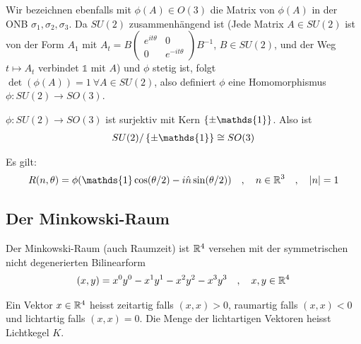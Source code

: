\vspace{1\baselineskip}

Wir bezeichnen ebenfalls mit $\phi(A) \in O(3)$ die Matrix von $\phi(A)$ in
der ONB $\sigma_1,\sigma_2,\sigma_3$. Da $SU(2)$ zusammenhängend ist (Jede
Matrix $A \in SU(2)$ ist von der Form $A_1$ mit $A_t = B \begin{pmatrix}
    e^{i t \theta} & 0 \\ 0 & e^{-i t \theta}
\end{pmatrix} B^{-1}$, $B \in SU(2)$, und der Weg $t \mapsto A_t$ verbindet
$\mathds{1}$ mit $A$) und $\phi$ stetig ist, folgt $\det(\phi(A)) = 1 \
\forall A \in SU(2)$, also definiert $\phi$ eine Homomorphismus
$\phi: SU(2) \rightarrow SO(3)$.

\begin{satz}
    $\phi: SU(2) \rightarrow SO(3)$ ist surjektiv mit Kern
    $\geschwungeneklammer{\pm \mathds{1}}$. Also ist
    \begin{align*}
        SU(2) / \geschwungeneklammer{\pm \mathds{1}} \cong SO(3)
    \end{align*}
\end{satz}

\begin{bemerkung}
    Es gilt:
    \begin{align*}
        R(n,\theta) = \phi(\mathds{1} \cos(\theta/2) - i \hat{n} \sin(\theta/2))
        \hspace{10pt} , \hspace{10pt}
        n \in \R^3
        \hspace{10pt} , \hspace{10pt}
        \abs{n} = 1
    \end{align*}
\end{bemerkung}

\subsection{Der Minkowski-Raum}

Der Minkowski-Raum (auch Raumzeit) ist $\mathbb{R}^4$ versehen mit der symmetrischen
nicht degenerierten Bilinearform
\begin{align*}
    (x,y) = x^0 y^0 - x^1 y^1 - x^2 y^2 - x^3 y^3
    \hspace{10pt} , \hspace{10pt} x,y \in \mathbb{R}^4
\end{align*}

Ein Vektor $x \in \mathbb{R}^4$ heisst zeitartig falls $(x,x) > 0$, raumartig falls
$(x,x) < 0$ und lichtartig falls $(x,x) = 0$. Die Menge der lichtartigen
Vektoren heisst Lichtkegel $K$.


